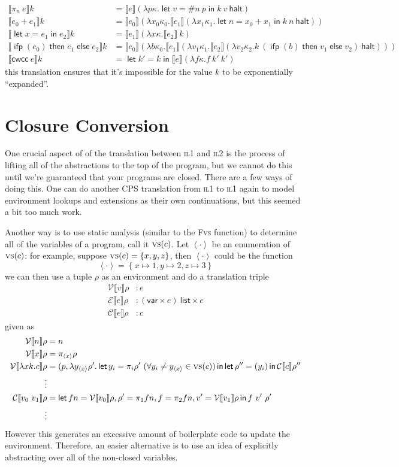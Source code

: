 \documentclass[11pt,a4paper]{article}
\newcommand {\coo} [1] {\ensuremath{\operatorname{\mathsf{#1}}}}
\newcommand {\co} [1] {\coo{#1}}
\newcommand {\Ifp}[3] {\co{ifp} (#1) \co{then} #2 \co{else} #3}
\newcommand{\Let}[1]{\coo{let} #1 \coo{in} }
\newcommand{\Rec}[1]{\left\{#1\right\}}
\newcommand{\ba}[1]{\left\langle #1\right\rangle}
\newcommand{\f}[1]{\textsc{#1}}
\newcommand{\g}[1]{\textsf{#1}}
\newcommand{\trans}[2]{\ensuremath{\mathcal{#1}\llbracket #2\rrbracket}}
\begin{document}
\begin{enumerate}[label=\textbf{Excercise \arabic*\ }]
\begin{enumerate}
\begin{align*}
\trans{}{\pi_n~e} k &= \trans{}{e} (\lambda p\kappa. \Let{v = \#n~p}{k~v~\g{halt}}) \\
\trans{}{e_0 + e_1} k &= \trans{}{e_0} (\lambda x_0\kappa_0. \trans{}{e_1} (\lambda x_1\kappa_1. \Let{n = x_0 + x_1}{k~n~\g{halt}})) \\
\trans{}{\Let{x = e_1}{e_2}} k &= \trans{}{e_1}(\lambda x\kappa. \trans{}{e_2}~k) \\
\trans{}{\Ifp{e_0}{e_1}{e_2}} k &= \trans{}{e_0}(\lambda b\kappa_0. \trans{}{e_1} (\lambda v_1\kappa_1. \trans{}{e_2} (\lambda v_2\kappa_2. k~(\Ifp{b}{v_1}{v_2})~\g{halt}))) \\
\trans{}{\g{cwcc}~e} k &= \Let{k' = k}{\trans{}{e}(\lambda f\kappa. f~k'~k')}
\end{align*}
this translation ensures that it's impossible for the value $k$ to be exponentially ``expanded''.
\section*{Closure Conversion}
One crucial aspect of of the translation between \f{il1} and \f{il2} is the process of lifting all of the abstractions to the top of the program, but we cannot do this until we're guaranteed that your programs are closed. There are a few ways of doing this. One can do another \f{CPS} translation from \f{il1} to \f{il1} again to model environment lookups and extensions as their own continuations, but this seemed a bit too much work. 

Another way is to use static analysis (similar to the \f{Fvs} function) to determine all of the variables of a program, call it $\f{vs}(c)$. Let $\ba{\cdot}$ be an enumeration of $\f{vs}(c)$: for example, suppose $\f{vs}(c) = \Rec{x,y,z}$, then $\ba{\cdot}$ could be the function
$$
\ba{\cdot} = \Rec{x \mapsto 1, y \mapsto 2, z \mapsto 3}
$$
we can then use a tuple $\rho$ as an environment and do a translation triple
\begin{align*}
\trans{V}{v} \rho &: e \\
\trans{E}{e} \rho &: (\g{var}\times e)~\g{list} \times e \\
\trans{C}{e} \rho &: c
\end{align*}
given as
\begin{align*}
\trans{V}{n}\rho &= n \\
\trans{V}{x}\rho &= \pi_{\ba{x}}\rho \\
\trans{V}{\lambda xk.c} \rho &= (p, \lambda y_{\ba{x}}\rho'. \Let{y_i = \pi_i \rho' ~ (\forall y_i \ne y_{\ba{x}} \in \f{vs}(c))}{\Let{\rho'' = (y_i)}{\trans{C}{c}\rho''}} \\
\vdots \\
\trans{C}{v_0~v_1}\rho &= \Let{fn = \trans{V}{v_0}\rho, \rho' = \pi_1 fn, f = \pi_2 fn, v' = \trans{V}{v_1}\rho}{f~v'~\rho'} \\
\vdots
\end{align*}
However this generates an excessive amount of boilerplate code to update the environment. Therefore, an easier alternative is to use an idea of explicitly abstracting over all of the non-closed variables.


\end{enumerate}
\end{enumerate}
\end{document}
